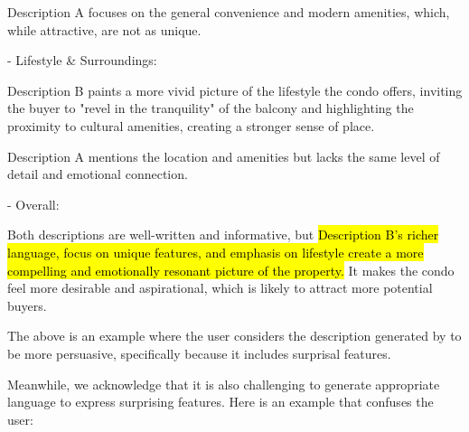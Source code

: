 \begin{center}
\begin{tcolorbox}[colback=white,colframe=gray!20,width=0.95\textwidth]
{Description A focuses on the general convenience and modern amenities, which, while attractive, are not as unique.

- Lifestyle \& Surroundings:

Description B paints a more vivid picture of the lifestyle the condo offers, inviting the buyer to "revel in the tranquility" of the balcony and highlighting the proximity to cultural amenities, creating a stronger sense of place.

Description A mentions the location and amenities but lacks the same level of detail and emotional connection.

- Overall:

Both descriptions are well-written and informative, but \hl{Description B's richer language, focus on unique features, and emphasis on lifestyle create a more compelling and emotionally resonant picture of the property.} It makes the condo feel more desirable and aspirational, which is likely to attract more potential buyers. 
}
    \end{tcolorbox}
\end{center}

The above is an example where the user considers the description generated by \agentname to be more persuasive, specifically because it includes surprisal features. 

Meanwhile, we acknowledge that it is also challenging to generate appropriate language to express surprising features. Here is an example that confuses the user: 

